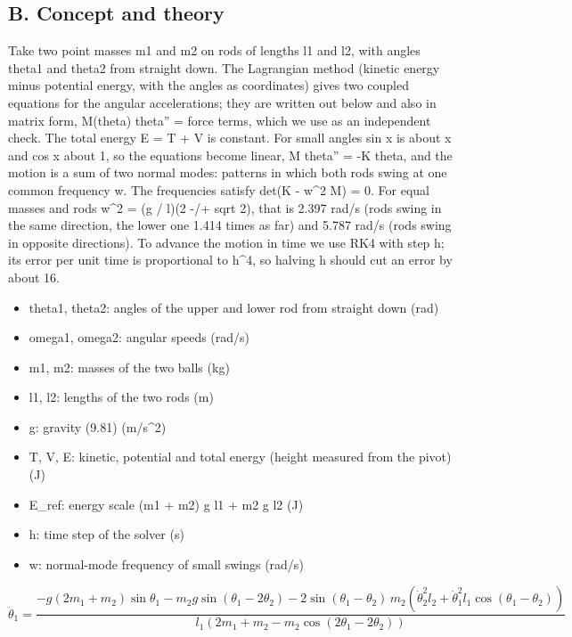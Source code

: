 \documentclass[11pt,a4paper]{article}
\begin{document}
\subsection*{B. Concept and theory}
Take two point masses m1 and m2 on rods of lengths l1 and l2, with angles theta1 and theta2 from straight down. The Lagrangian method (kinetic energy minus potential energy, with the angles as coordinates) gives two coupled equations for the angular accelerations; they are written out below and also in matrix form, M(theta) theta'' = force terms, which we use as an independent check. The total energy E = T + V is constant. For small angles sin x is about x and cos x about 1, so the equations become linear, M theta'' = -K theta, and the motion is a sum of two normal modes: patterns in which both rods swing at one common frequency w. The frequencies satisfy det(K - w\textasciicircum{}2 M) = 0. For equal masses and rods w\textasciicircum{}2 = (g / l)(2 -/+ sqrt 2), that is 2.397 rad/s (rods swing in the same direction, the lower one 1.414 times as far) and 5.787 rad/s (rods swing in opposite directions). To advance the motion in time we use RK4 with step h; its error per unit time is proportional to h\textasciicircum{}4, so halving h should cut an error by about 16.

\begin{itemize}[nosep]
\item theta1, theta2: angles of the upper and lower rod from straight down (rad)
\item omega1, omega2: angular speeds (rad/s)
\item m1, m2: masses of the two balls (kg)
\item l1, l2: lengths of the two rods (m)
\item g: gravity (9.81) (m/s\textasciicircum{}2)
\item T, V, E: kinetic, potential and total energy (height measured from the pivot) (J)
\item E\_ref: energy scale (m1 + m2) g l1 + m2 g l2 (J)
\item h: time step of the solver (s)
\item w: normal-mode frequency of small swings (rad/s)
\end{itemize}

\begin{equation*}
\ddot\theta_1=\frac{-g(2m_1+m_2)\sin\theta_1-m_2g\sin(\theta_1-2\theta_2)-2\sin(\theta_1-\theta_2)\,m_2\left(\dot\theta_2^{2}l_2+\dot\theta_1^{2}l_1\cos(\theta_1-\theta_2)\right)}{l_1\left(2m_1+m_2-m_2\cos(2\theta_1-2\theta_2)\right)}
\end{equation*}
\end{document}
